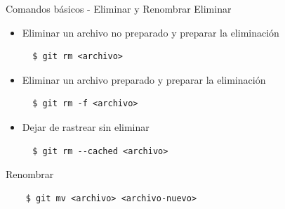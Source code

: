 \begin{frame}[fragile]{Comandos básicos - Eliminar y Renombrar}
  \alert{Eliminar}
  \begin{itemize}
    \item Eliminar un archivo no preparado y preparar la eliminación
    \begin{verbatim}
  $ git rm <archivo>
    \end{verbatim}
    \item Eliminar un archivo preparado y preparar la eliminación
    \begin{verbatim}
  $ git rm -f <archivo>
    \end{verbatim}
    \item Dejar de rastrear sin eliminar
    \begin{verbatim}
  $ git rm --cached <archivo>
    \end{verbatim}
  \end{itemize}

  \alert{Renombrar}
  \begin{verbatim}
    $ git mv <archivo> <archivo-nuevo>
  \end{verbatim}

\end{frame}
